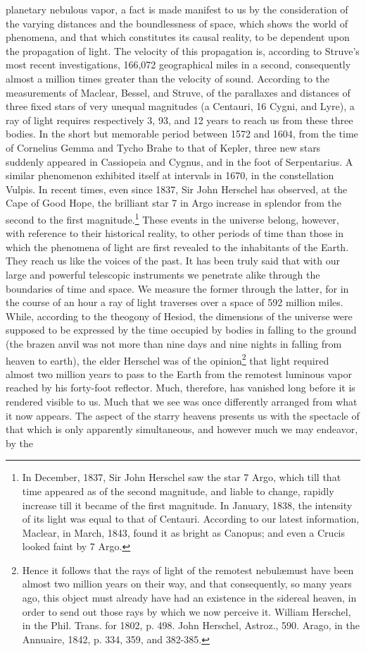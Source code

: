 planetary nebulous vapor, a fact is made manifest to us by the consideration of the varying distances and the boundlessness of space, which shows the world of phenomena, and that which constitutes its causal reality, to be dependent upon the propagation of light. The velocity of this propagation is, according to Struve's most recent investigations, 166,072 geographical miles in a second, consequently almost a million times greater than the velocity of sound. According to the measurements of Maclear, Bessel, and Struve, of the parallaxes and distances of three fixed stars of very unequal magnitudes (a Centauri, 16 Cygni, and Lyre), a ray of light requires respectively 3, 93, and 12 years to reach us from these three bodies. In the short but memorable period between 1572 and 1604, from the time of Cornelius Gemma and Tycho Brahe to that of Kepler, three new stars suddenly appeared in Cassiopeia and Cygnus, and in the foot of Serpentarius. A similar phenomenon exhibited itself at intervals in 1670, in the constellation Vulpis. In recent times, even since 1837, Sir John Herschel has observed, at the Cape of Good Hope, the brilliant star 7 in Argo increase in splendor from the second to the first magnitude.\footnote{In December, 1837, Sir John Herschel saw the star 7 Argo, which till that time appeared as of the second magnitude, and liable to change, rapidly increase till it became of the first magnitude. In January, 1838, the intensity of its light was equal to that of Centauri. According to our latest information, Maclear, in March, 1843, found it as bright as Canopus; and even a Crucis looked faint by 7 Argo.} These events in the universe belong, however, with reference to their historical reality, to other periods of time than those in which the phenomena of light are first revealed to the inhabitants of the Earth. They reach us like the voices of the past. It has been truly said that with our large and powerful telescopic instruments we penetrate alike through the boundaries of time and space. We measure the former through the latter, for in the course of an hour a ray of light traverses over a space of 592 million miles. While, according to the theogony of Hesiod, the dimensions of the universe were supposed to be expressed by the time occupied by bodies in falling to the ground (the brazen anvil was not more than nine days and nine nights in falling from heaven to earth), the elder Herschel was of the opinion\footnote{Hence it follows that the rays of light of the remotest nebul\ae must have been almost two million years on their way, and that consequently, so many years ago, this object must already have had an existence in the sidereal heaven, in order to send out those rays by which we now perceive it. William Herschel, in the Phil. Trans. for 1802, p. 498. John Herschel, Astroz., 590. Arago, in the Annuaire, 1842, p. 334, 359, and 382-385.} that light required almost two million years to pass to the Earth from the remotest luminous vapor reached by his forty-foot reflector. Much, therefore, has vanished long before it is rendered visible to us. Much that we see was once differently arranged from what it now appears. The aspect of the starry heavens presents us with the spectacle of that which is only apparently simultaneous, and however much we may endeavor, by the 